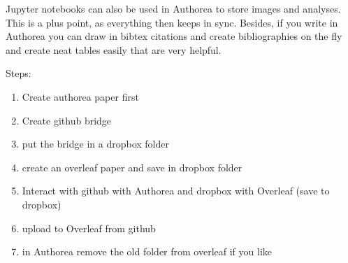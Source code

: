 Jupyter notebooks can also be used in Authorea to store images and analyses. This is a plus point, as everything then keeps in sync. Besides, if you write in Authorea you can draw in bibtex citations and create bibliographies on the fly and create neat tables easily that are very helpful. 

Steps:
\begin{enumerate}
\item Create authorea paper first
\item Create github bridge
\item put the bridge in a dropbox folder
\item create an overleaf paper and save in dropbox folder
\item Interact with github with Authorea and dropbox with Overleaf (save to dropbox)
\item upload to Overleaf from github
\item in Authorea remove the old folder from overleaf if you like
\end{enumerate}

